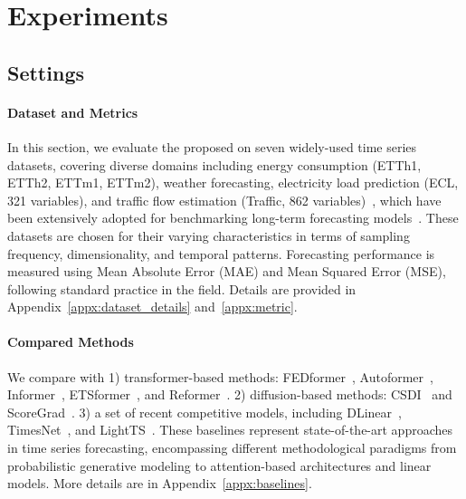 


\section{Experiments}
\label{sec:experiments}
\subsection{Settings}
\paragraph{Dataset and Metrics} %
In this section, we evaluate the proposed \model on seven widely-used time series datasets, covering diverse domains including energy consumption (ETTh1, ETTh2, ETTm1, ETTm2), weather forecasting, electricity load prediction (ECL, 321 variables), and traffic flow estimation (Traffic, 862 variables)~\cite{zhou2021informer, lai2018modeling}, which have been extensively adopted for benchmarking long-term forecasting models~\cite{wu2022timesnet}. These datasets are chosen for their varying characteristics in terms of sampling frequency, dimensionality, and temporal patterns. Forecasting performance is measured using Mean Absolute Error (MAE) and Mean Squared Error (MSE), following standard practice in the field. Details are provided in Appendix~\ref{appx:dataset_details} and~\ref{appx:metric}.
\paragraph{Compared Methods} %
We compare with 1) transformer-based methods: %
FEDformer~\cite{zhou2022fedformer}, Autoformer~\cite{wu2021autoformer}, Informer~\cite{zhou2021informer}, 
ETSformer~\cite{woo2022etsformer}, and Reformer~\cite{kitaev2020reformer}. 
2) diffusion-based methods: 
CSDI~\cite{tashiro2021csdi} and ScoreGrad~\cite{yan2021scoregrad}. 
3) a set of recent competitive models, including 
DLinear~\cite{zeng2023transformers}, TimesNet~\cite{wu2022timesnet}, 
and LightTS~\cite{zhang2022less}. 
These baselines represent state-of-the-art approaches in time series forecasting, encompassing different methodological paradigms from probabilistic generative modeling to attention-based architectures and linear models. More details are in Appendix~\ref{appx:baselines}.

